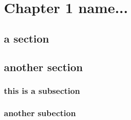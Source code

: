 \chapter{Chapter 1 name...}


\section{a section}

\lipsum[1-2]


\section{another section}

\lipsum[3-5]

\subsection{this is a subsection}

\lipsum[7-8]

\subsection{another subection}

\lipsum[4-6]
